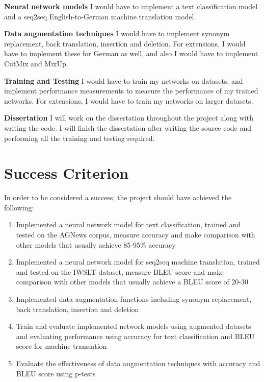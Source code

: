\documentclass[60pt]{article}
\begin{document}
\textbf{Neural network models} I would have to implement a text classification model and a seq2seq English-to-German machine translation model.
\par

\textbf{Data augmentation techniques} I would have to implement synonym replacement, back translation, insertion and deletion. For extensions, I would have to implement these for German as well, and also I would have to implement CutMix and MixUp.
\par

\textbf{Training and Testing} I would have to train my networks on datasets, and implement performance measurements to measure the performance of my trained networks. For extensions, I would have to train my networks on larger datasets.
\par

\textbf{Dissertation} I will work on the dissertation throughout the project along with writing the code. I will finish the dissertation after writing the source code and performing all the training and testing required.

\section{Success Criterion}
\par 
In order to be considered a success, the project should have achieved the following:
\begin{enumerate}
    \item Implemented a neural network model for text classification, trained and tested on the AGNews \cite{Zhang2015CharacterlevelCN} corpus, measure accuracy and make comparison with other models that usually achieve 85-95\% accuracy
    \item Implemented a neural network model for seq2seq machine translation, trained and tested on the IWSLT \cite{cettolo-etal-2017-overview} dataset, measure BLEU score and make comparison with other models that usually achieve a BLEU score of 20-30
    \item Implemented data augmentation functions including synonym replacement, back translation, insertion and deletion
    \item Train and evaluate implemented network models using augmented datasets and evaluating performance using accuracy for text classification and BLEU score for machine translation
    \item Evaluate the effectiveness of data augmentation techniques with accuracy and BLEU score using p-tests
    
\end{enumerate}
\end{document}
